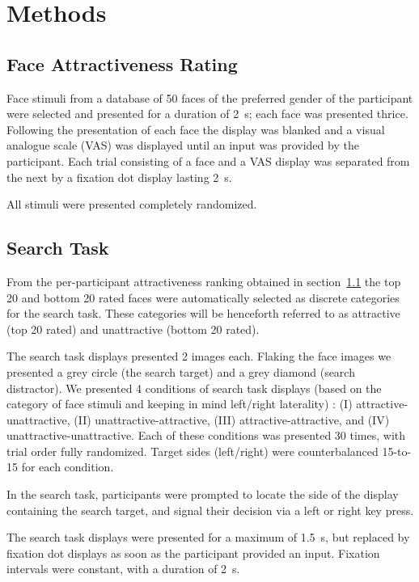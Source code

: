 \section{Methods}
    \subsection{Face Attractiveness Rating}\label{sec:m_far}
	Face stimuli from a database of 50 faces of the preferred gender of the participant were selected and presented for a duration of \SI{2}{\second}; each face was presented thrice.
	Following the presentation of each face the display was blanked and a visual analogue scale (VAS) was displayed until an input was provided by the participant.
	Each trial consisting of a face and a VAS display was separated from the next by a fixation dot display lasting \SI{2}{\second}.
	
	All stimuli were presented completely randomized.
    \subsection{Search Task}\label{sec:m_st}
	From the per-participant attractiveness ranking obtained in section~\ref{sec:m_far} the top 20 and bottom 20 rated faces were automatically selected as discrete categories for the search task.
	These categories will be henceforth referred to as attractive (top 20 rated) and unattractive (bottom 20 rated).
	

	The search task displays presented 2 images each.
	Flaking the face images we presented a grey circle (the search target) and a grey diamond (search distractor).
	We presented 4 conditions of search task displays (based on the category of face stimuli and keeping in mind left/right laterality) : (I) attractive-unattractive, (II) unattractive-attractive, (III) attractive-attractive, and (IV) unattractive-unattractive.
	Each of these conditions was presented 30 times, with trial order fully randomized.
	Target sides (left/right) were counterbalanced 15-to-15 for each condition.
	
	In the search task, participants were prompted to locate the side of the display containing the search target, and signal their decision via a left or right key press.

	The search task displays were presented for a maximum of \SI{1.5}{\second}, but replaced by fixation dot displays as soon as the participant provided an input.
	Fixation intervals were constant, with a duration of \SI{2}{\second}.
